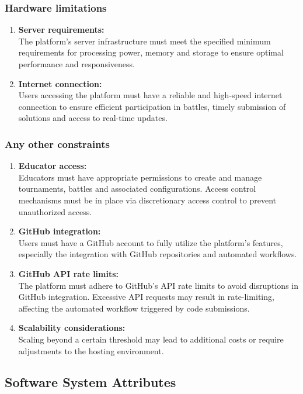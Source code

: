 \subsubsection{Hardware limitations}
\begin{enumerate}
  \item \textbf{Server requirements:} \\
  The platform's server infrastructure must meet the specified minimum requirements for processing power, memory and storage to ensure optimal performance and responsiveness.
  \item \textbf{Internet connection:} \\
  Users accessing the platform must have a reliable and high-speed internet connection to ensure efficient participation in battles, timely submission of solutions and access to real-time updates.
\end{enumerate}

\subsubsection{Any other constraints}
\begin{enumerate}
  \item \textbf{Educator access:} \\
  Educators must have appropriate permissions to create and manage tournaments, battles and associated configurations. Access control mechanisms must be in place via discretionary access control to prevent unauthorized access.
  \item \textbf{GitHub integration:} \\
  Users must have a GitHub account to fully utilize the platform's features, especially the integration with GitHub repositories and automated workflows.
  \item \textbf{GitHub API rate limits:} \\
  The platform must adhere to GitHub's API rate limits to avoid disruptions in GitHub integration. Excessive API requests may result in rate-limiting, affecting the automated workflow triggered by code submissions.
  \item \textbf{Scalability considerations:} \\
  Scaling beyond a certain threshold may lead to additional costs or require adjustments to the hosting environment.
\end{enumerate}

\subsection{Software System Attributes}
